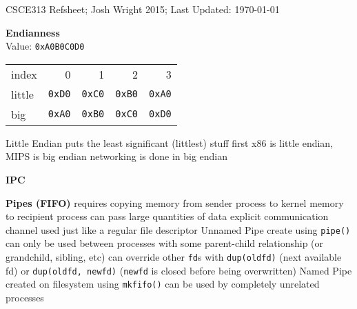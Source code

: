 \documentclass[12pt]{article}
\begin{document}
\begin{spacing}{0.8}


\begin{multicols*}{2}
\begin{flushleft}
\begin{outline}[longenum]
\let\oldOne\1\let\oldTwo\2\let\oldThree\3\let\oldFour\4
\renewcommand{\1}{\oldOne   \hspace{-8px}}
\renewcommand{\2}{\oldTwo   \hspace{-8px}}
\renewcommand{\3}{\oldThree \hspace{-8px}}
\renewcommand{\4}{\oldFour  \hspace{-8px}}
\newcommand{\zzz}[1]{\0 \textbf{#1} }

\small

CSCE313 Refsheet; 
\textcopyright \space Josh Wright 2015;
Last Updated: \today

\zzz{Endianness}
\\
Value: \verb|0xA0B0C0D0|\\
  \1 
  \begin{tabular}{l r r r r}
  index  & 0 & 1 & 2 & 3 \\
  little & \verb|0xD0| & \verb|0xC0| & \verb|0xB0| & \verb|0xA0| \\
  big    & \verb|0xA0| & \verb|0xB0| & \verb|0xC0| & \verb|0xD0| \\
  \end{tabular}
    \2 Little Endian puts the least significant (littlest) stuff first
  \1 x86 is little endian, MIPS is big endian
  \1 networking is done in big endian

\zzz{IPC}

\zzz{Pipes (FIFO)}
  \1 requires copying memory from sender process to kernel memory to recipient process
  \1 can pass large quantities of data
  \1 explicit communication channel
  \1 used just like a regular file descriptor
  \1 Unnamed Pipe
    \2 create using \verb|pipe()|
    \2 can only be used between processes with some parent-child relationship
      (or grandchild, sibling, etc)
    \2 can override other \verb|fd|s with 
      \3 \verb|dup(oldfd)| (next available fd) or
      \3 \verb|dup(oldfd, newfd)| (\verb|newfd| is closed before being overwritten)
  \1 Named Pipe
    \2 created on filesystem using \verb|mkfifo()|
    \2 can be used by completely unrelated processes


\end{outline}
\end{flushleft}
\end{multicols*}
\end{spacing}
\end{document}
